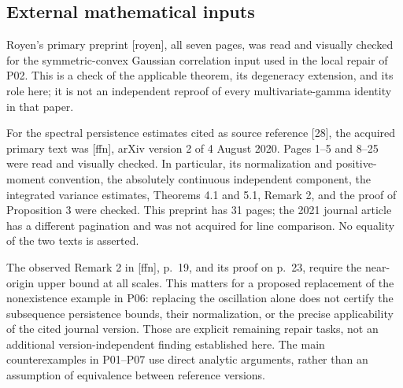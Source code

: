 \documentclass[10pt]{article}
\begin{document}
\subsection*{External mathematical inputs}
Royen’s primary preprint [royen], all seven pages, was read and visually checked for the symmetric-convex Gaussian correlation input used in the local repair of P02. This is a check of the applicable theorem, its degeneracy extension, and its role here; it is not an independent reproof of every multivariate-gamma identity in that paper.\par
For the spectral persistence estimates cited as source reference [28], the acquired primary text was [ffn], arXiv version 2 of 4 August 2020. Pages 1–5 and 8–25 were read and visually checked. In particular, its normalization and positive-moment convention, the absolutely continuous independent component, the integrated variance estimates, Theorems 4.1 and 5.1, Remark 2, and the proof of Proposition 3 were checked. This preprint has 31 pages; the 2021 journal article has a different pagination and was not acquired for line comparison. No equality of the two texts is asserted.\par
The observed Remark 2 in [ffn], p. 19, and its proof on p. 23, require the near-origin upper bound at all scales. This matters for a proposed replacement of the nonexistence example in P06: replacing the oscillation alone does not certify the subsequence persistence bounds, their normalization, or the precise applicability of the cited journal version. Those are explicit remaining repair tasks, not an additional version-independent finding established here. The main counterexamples in P01–P07 use direct analytic arguments, rather than an assumption of equivalence between reference versions.\par
\end{document}
